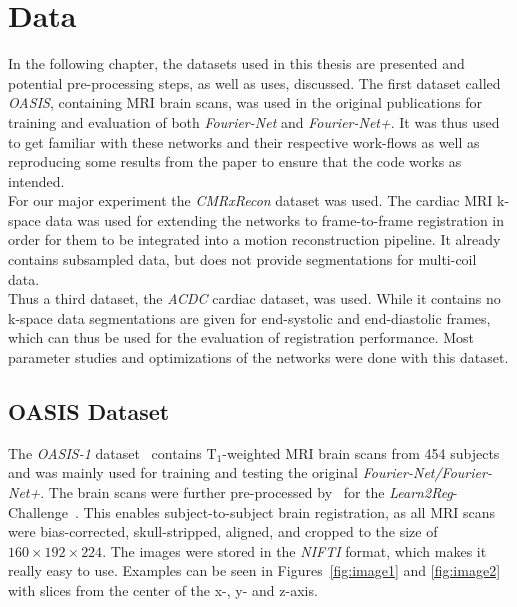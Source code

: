 \documentclass[english,version-2022-01]{uzl-thesis} %
\begin{document}

\chapter{Data}	\label{Ch:Data}
In the following chapter, the datasets used in this thesis are presented and potential pre-processing steps, as well as uses, discussed. The first dataset called \emph{OASIS}, containing MRI brain scans, was used in the original publications for training and evaluation of both \emph{Fourier-Net} and \emph{Fourier-Net+}. It was thus used to get familiar with these networks and their respective work-flows as well as reproducing some results from the paper to ensure that the code works as intended.\\ 
For our major experiment the \emph{CMRxRecon} dataset was used. The cardiac MRI k-space data was used for extending the networks to frame-to-frame registration in order for them to be integrated into a motion reconstruction pipeline. It already contains subsampled data, but does not provide segmentations for multi-coil data.\\
Thus a third dataset, the \emph{ACDC} cardiac dataset, was used. While it contains no k-space data segmentations are given for end-systolic and end-diastolic frames, which can thus be used for the evaluation of registration performance. Most parameter studies and optimizations of the networks were done with this dataset.

\section{OASIS Dataset} \label{Sec:OASIS}
The \emph{OASIS-1} dataset~\cite{OASIS} contains $\text{T}_1$-weighted MRI brain scans from 454 subjects and was mainly used for training and testing the original \emph{Fourier-Net/Fourier-Net+}. The brain scans were further pre-processed by~\cite{HyperMorph} for the \emph{Learn2Reg}-Challenge~\cite{Learn2Reg}. This enables subject-to-subject brain registration, as all MRI scans were bias-corrected, skull-stripped, aligned, and cropped to the size of $160 \times 192 \times 224$. The images were stored in the \emph{NIFTI} format,  which makes it really easy to use. Examples can be seen in Figures~\ref{fig:image1} and \ref{fig:image2} with slices from the center of the x-, y- and z-axis.
\end{document}
